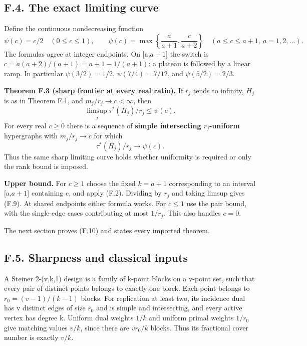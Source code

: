 \documentclass[
  11pt,
]{article}
\begin{document}
\subsection{F.4. The exact limiting
curve}\label{f.4.-the-exact-limiting-curve}

Define the continuous nondecreasing function \[
 \psi(c)=c/2\quad(0\le c\le1),\qquad
 \psi(c)=\max\left\{\frac{a}{a+1},\frac{c}{a+2}\right\}
               \quad(a\le c\le a+1,\ a=1,2,\ldots).         \tag{F.8}
\] The formulas agree at integer endpoints. On {[}a,\(a+1\){]} the
switch is \(c=a(a+2)/(a+1)=a+1-1/(a+1)\): a plateau is followed by a
linear ramp. In particular \(\psi(3/2)=1/2\), \(\psi(7/4)=7/12\), and
\(\psi(5/2)=2/3\).

\textbf{Theorem F.3 (sharp frontier at every real ratio).} If \(r_j\)
tends to infinity, \(H_j\) is as in Theorem F.1, and
\(m_j/r_j\to c<\infty\), then \[
                   \limsup_j\tau^*(H_j)/r_j\le\psi(c).       \tag{F.9}
\] For every real \(c\ge0\) there is a sequence of \textbf{simple
intersecting \(r_j\)-uniform} hypergraphs with \(m_j/r_j\to c\) for
which \[
                         \tau^*(H_j)/r_j\to\psi(c).         \tag{F.10}
\] Thus the same sharp limiting curve holds whether uniformity is
required or only the rank bound is imposed.

\textbf{Upper bound.} For \(c\ge1\) choose the fixed \(k=a+1\)
corresponding to an interval {[}a,\(a+1\){]} containing c, and apply
(F.2). Dividing by \(r_j\) and taking limsup gives (F.9). At shared
endpoints either formula works. For \(c\le1\) use the pair bound, with
the single-edge cases contributing at most \(1/r_j\). This also handles
\(c=0\).

The next section proves (F.10) and states every imported theorem.

\subsection{F.5. Sharpness and classical
inputs}\label{f.5.-sharpness-and-classical-inputs}

A Steiner 2-(v,k,1) design is a family of k-point blocks on a v-point
set, such that every pair of distinct points belongs to exactly one
block. Each point belongs to \(r_0=(v-1)/(k-1)\) blocks. For replication
at least two, its incidence dual has v distinct edges of size \(r_0\)
and is simple and intersecting, and every active vertex has degree k.
Uniform dual weights \(1/k\) and uniform primal weights \(1/r_0\) give
matching values \(v/k\), since there are \(v r_0/k\) blocks. Thus its
fractional cover number is exactly \(v/k\).
\end{document}
